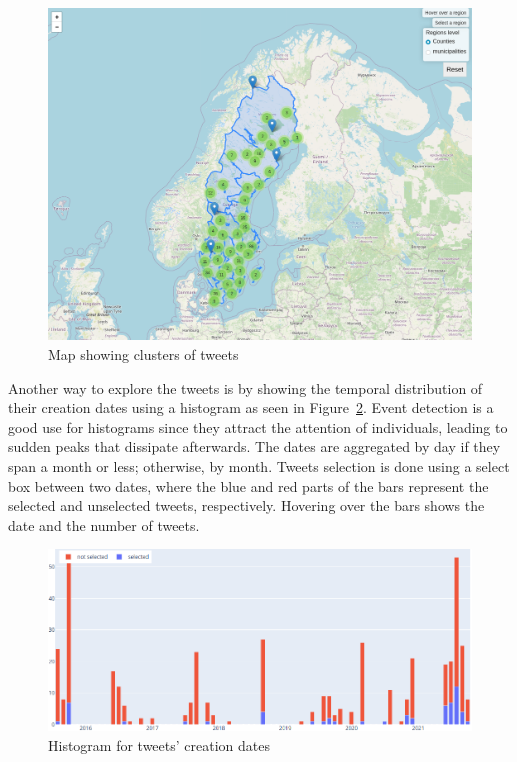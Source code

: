 \begin{figure}[H]
\begin{center}
  \includegraphics[width=\columnwidth]{./images/map.png}
\end{center}
\caption{Map showing clusters of tweets}
\label{fig:map}
\end{figure}

Another way to explore the tweets is by showing the temporal distribution of their creation dates
using a histogram as seen in Figure~\ref{fig:histogram}. Event detection is a good use for
histograms since they attract the attention of individuals, leading to sudden peaks that dissipate
afterwards. The dates are aggregated by day if they span a month or less; otherwise, by month.
Tweets selection is done using a select box between two dates, where the blue and red parts of the
bars represent the selected and unselected tweets, respectively. Hovering over the bars shows the
date and the number of tweets.

\begin{figure}[H]
\begin{center}
  \includegraphics[width=\columnwidth]{./images/histogram.png}
\end{center}
\caption{Histogram for tweets' creation dates}
\label{fig:histogram}
\end{figure}

